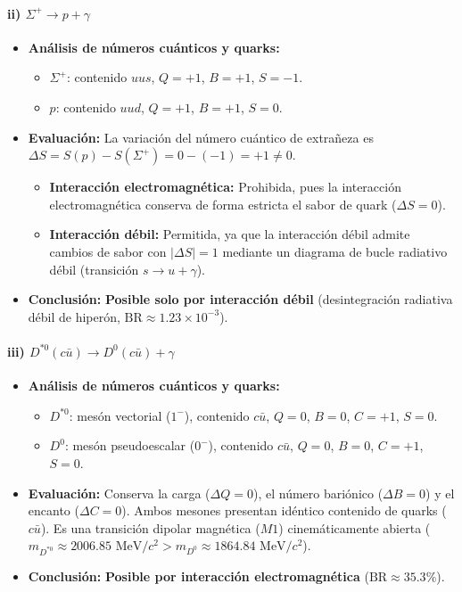 \begin{problema}
\paragraph{ii) $\Sigma^+ \longrightarrow p + \gamma$}
\begin{itemize}
    \item \textbf{Análisis de números cuánticos y quarks:}
    \begin{itemize}
        \item $\Sigma^+$: contenido $uus$, $Q=+1$, $B=+1$, $S=-1$.
        \item $p$: contenido $uud$, $Q=+1$, $B=+1$, $S=0$.
    \end{itemize}
    \item \textbf{Evaluación:} La variación del número cuántico de extrañeza es $\Delta S = S(p) - S(\Sigma^+) = 0 - (-1) = +1 \neq 0$.
    \begin{itemize}
        \item \textbf{Interacción electromagnética:} Prohibida, pues la interacción electromagnética conserva de forma estricta el sabor de quark ($\Delta S = 0$).
        \item \textbf{Interacción débil:} Permitida, ya que la interacción débil admite cambios de sabor con $|\Delta S| = 1$ mediante un diagrama de bucle radiativo débil (transición $s \to u + \gamma$).
    \end{itemize}
    \item \textbf{Conclusión:} \textbf{Posible solo por interacción débil} (desintegración radiativa débil de hiperón, $\text{BR} \approx 1.23 \times 10^{-3}$).
\end{itemize}

\paragraph{iii) $D^{*0} (c\bar{u}) \longrightarrow D^0 (c\bar{u}) + \gamma$}
\begin{itemize}
    \item \textbf{Análisis de números cuánticos y quarks:}
    \begin{itemize}
        \item $D^{*0}$: mesón vectorial ($1^-$), contenido $c\bar{u}$, $Q=0$, $B=0$, $C=+1$, $S=0$.
        \item $D^0$: mesón pseudoescalar ($0^-$), contenido $c\bar{u}$, $Q=0$, $B=0$, $C=+1$, $S=0$.
    \end{itemize}
    \item \textbf{Evaluación:} Conserva la carga ($\Delta Q = 0$), el número bariónico ($\Delta B = 0$) y el encanto ($\Delta C = 0$). Ambos mesones presentan idéntico contenido de quarks ($c\bar{u}$). Es una transición dipolar magnética ($M1$) cinemáticamente abierta ($m_{D^{*0}} \approx 2006.85\text{ MeV}/c^2 > m_{D^0} \approx 1864.84\text{ MeV}/c^2$).
    \item \textbf{Conclusión:} \textbf{Posible por interacción electromagnética} ($\text{BR} \approx 35.3\%$).
\end{itemize}


\end{problema}

